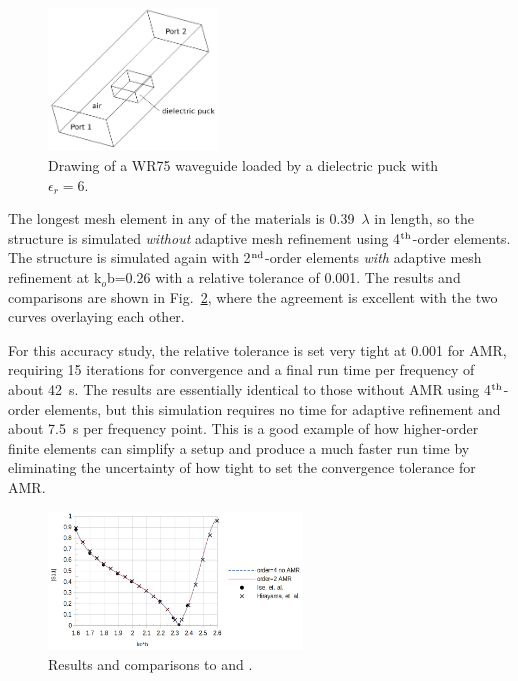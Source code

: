 \documentclass[titlepage]{article}
\renewcommand\_{\textunderscore\linebreak[1]}
\begin{document}
\begin{figure}[H]
  \centering
  \includegraphics[width=0.4\textwidth]{../regression/OpenParEM3D/WR75/dielectric-loading_study/screenshots/loading_drawing}
  \caption{Drawing of a WR75 waveguide loaded by a dielectric puck with $\epsilon_r=6$.}
  \label{fig:loading_drawing}
\end{figure}

The longest mesh element in any of the materials is 0.39~$\lambda$ in length, so the structure is simulated \textit{without} adaptive mesh refinement using 4$^{\textnormal{th}}$-order elements.  The structure is simulated again with 
2$^{\textnormal{nd}}$-order elements \textit{with} adaptive mesh refinement at k$_o$b=0.26 with a relative tolerance of 0.001.  The results and comparisons are shown in Fig.~\ref{fig:loading_results}, where the agreement is excellent with the two curves overlaying each other.

For this accuracy study, the relative tolerance is set very tight at 0.001 for AMR, requiring 15 iterations for convergence and a final run time per frequency of about 42~s.  The results are essentially identical to those without AMR using 4$^{\textnormal{th}}$-order elements, but this simulation requires no time for adaptive refinement and about 7.5~s per frequency point.  This is a good example of how higher-order finite elements can simplify a setup and produce a much faster run time by eliminating the uncertainty of how tight to set the convergence tolerance for AMR.


\begin{figure}[H]
  \centering
  \includegraphics[width=0.6\textwidth]{../regression/OpenParEM3D/WR75/dielectric-loading_study/screenshots/loading_results}
  \caption{Results and comparisons to \cite{Ise} and \cite{Hirayama}.}
  \label{fig:loading_results}
\end{figure}
\end{document}
